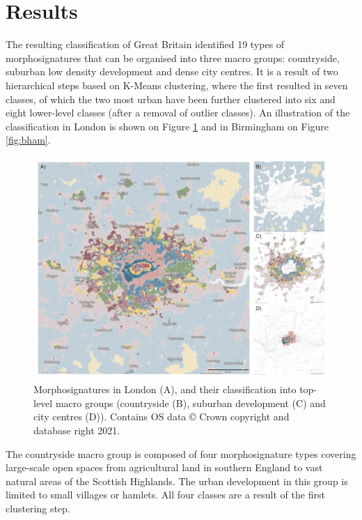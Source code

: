 \section{Results}
\label{sec:res}

The resulting classification of Great Britain identified 19 types of
morphosignatures that can be organised into three macro groups: countryside, suburban low
density development and dense city centres. It is a result of two hierarchical steps
based on K-Means clustering, where the first resulted in seven classes, of which the two
most urban have been further clustered into six and eight lower-level classes (after a removal
of outlier classes). An illustration of the classification in London is shown on Figure
\ref{fig:london} and in Birmingham on Figure \ref{fig:bham}.

\begin{figure}
    \includegraphics[width=0.75\linewidth, center]{fig/london.png}
    \caption{Morphosignatures in London (A), and their classification into
    top-level macro groups (countryside (B), suburban development (C) and city centres
    (D)).
    Contains OS data © Crown copyright and database right 2021. 
    }
    \label{fig:london}
\end{figure}

The countryside macro group is composed of four morphosignature types covering large-scale open
spaces from agricultural land in southern England to vast natural areas of the Scottish
Highlands. The urban development in this group is limited to small villages or hamlets.
All four classes are a result of the first clustering step.

